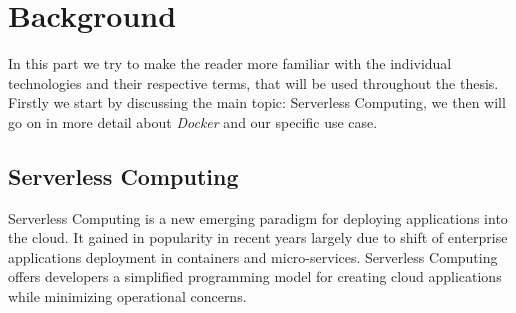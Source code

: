 \section{Background}

In this part we try to make the reader more familiar with the individual technologies and their
respective terms, that will be used throughout the thesis. Firstly we start by discussing the main
topic: Serverless Computing, we then will go on in more detail about \textit{Docker} and our
specific use case.

\subsection{Serverless Computing}

Serverless Computing is a new emerging paradigm for deploying applications into the cloud. It gained
in popularity in recent years largely due to shift of enterprise applications deployment in
containers and micro-services. Serverless Computing offers developers a simplified programming model
for creating cloud applications while minimizing operational concerns. \cite{servprog}
